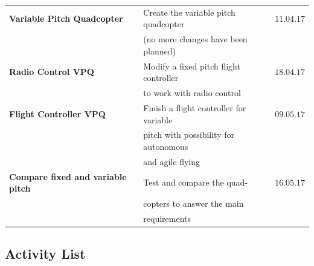 \begin{table}[H]
\begin{tabular}{llc}
\textbf{Variable Pitch Quadcopter}  & Create the variable pitch quadcopter & $11.04.17$ \\
                                    & (no more changes have been planned) & \\\rowcolor{gainsboro}
\textbf{Radio Control VPQ}  & Modify a fixed pitch flight controller & $18.04.17$ \\\rowcolor{gainsboro}
                                & to work with radio control & \\
\textbf{Flight Controller VPQ}  & Finish a flight controller for variable & $09.05.17$ \\
                            & pitch with possibility for autonomous & \\
                            & and agile flying & \\\rowcolor{gainsboro}
\textbf{Compare fixed and variable pitch}  & Test and compare the quad- & $16.05.17$ \\\rowcolor{gainsboro}
                                           & copters to answer the main & \\\rowcolor{gainsboro}
                                           & requirements & 
\end{tabular}                                                               
\end{table}

\subsection{Activity List}

